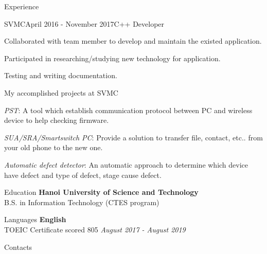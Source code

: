 \documentclass{resume}
\begin{document}
\begin{rSection}{Experience}
    \begin{rSubsection}{SVMC}{April 2016 - November 2017}{C++ Developer}{}
      \item Collaborated with team member to develop and maintain the existed application.
      \item Participated in researching/studying new technology for application.
      \item Testing and writing documentation.
    \end{rSubsection}

    \begin{rSubsection}{}{}{My accomplished projects at SVMC}{}
      \item \emph{PST}: A tool which establish communication protocol between PC and wireless device to help checking firmware.
      \item \emph{SUA/SRA/Smartswitch PC}: Provide a solution to transfer file, contact, etc.. from your old phone to the new one.
      \item \emph{Automatic defect detector}: An automatic approach to determine which device have defect and type of defect, stage cause defect.
    \end{rSubsection}
  
  \end{rSection}

  \begin{rSection}{Education}
    {\bf Hanoi University of Science and Technology} \\ 
    { B.S. in Information Technology (CTES program) } \\
  \end{rSection}

  \begin{rSection}{Languages}
    {\bf English} \\ 
    { TOEIC Certificate scored 805  } \hfill {\em August 2017 - August 2019} \\
  \end{rSection}

  \begin{rSection}{Contacts}
  \end{rSection}
\end{document}
